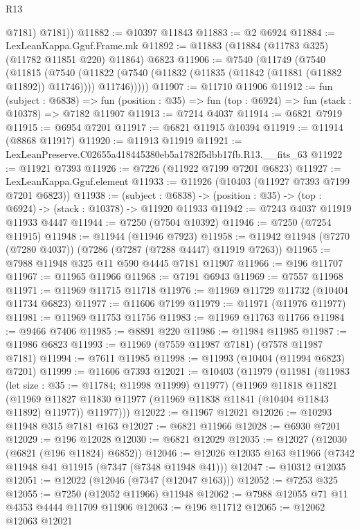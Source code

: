 \begin{lexlean}{R13}
\begin{coremodule}
          @7181)
        @7181))
@11882 := @10397 @11843
@11883 := @2 @6924
@11884 := LexLeanKappa.Gguf.Frame.mk
@11892 := @11883 (@11884 (@11783 @325) (@11782 @11851 @220) @11864) @6823
@11906 := @7540
    (@11749
      (@7540
        (@11815
          (@7540
            (@11822 (@7540 (@11832 (@11835 (@11842 (@11881 (@11882 @11892)) @11746)))) @11746)))))
@11907 := @11710 @11906
@11912 := fun (subject : @6838) =>
  fun (position : @35) => fun (top : @6924) => fun (stack : @10378) => @7182 @11907
@11913 := @7214 @4037
@11914 := @6821 @7919
@11915 := @6954 @7201
@11917 := @6821 @11915 @10394
@11919 := @11914 (@8868 @11917)
@11920 := @11913 @11919
@11921 := LexLeanPreserve.C02655a418445380eb5a1782f5dbb17fb.R13.__fits_63
@11922 := @11921 @7393
@11926 := @7226 (@11922 @7199 @7201 @6823)
@11927 := LexLeanKappa.Gguf.element
@11933 := @11926 (@10403 (@11927 @7393 @7199 @7201 @6823))
@11938 := (subject : @6838) ->
  (position : @35) -> (top : @6924) -> (stack : @10378) -> @11920 @11933
@11942 := @7243 @4037 @11919 @11933 @4447
@11944 := @7250 (@7504 @10392)
@11946 := @7250 (@7254 @11915)
@11948 := @11944 (@11946 @7923)
@11958 := @11942 @11948 (@7270 (@7280 @4037)) (@7286 (@7287 (@7288 @4447) @11919 @7263))
@11965 := @7988 @11948 @325 @11 @590 @4445 @7181 @11907
@11966 := @196 @11707
@11967 := @11965 @11966
@11968 := @7191 @6943
@11969 := @7557 @11968
@11971 := @11969 @11715 @11718
@11976 := @11969 @11729 @11732 (@10404 @11734 @6823)
@11977 := @11606 @7199
@11979 := @11971 (@11976 @11977)
@11981 := @11969 @11753 @11756
@11983 := @11969 @11763 @11766
@11984 := @9466 @7406
@11985 := @8891 @220
@11986 := @11984 @11985
@11987 := @11986 @6823
@11993 := @11969 (@7559 @11987 @7181) (@7578 @11987 @7181)
@11994 := @7611 @11985
@11998 := @11993 (@10404 (@11994 @6823) @7201)
@11999 := @11606 @7393
@12021 := @10403
    (@11979
      (@11981
        (@11983 (let size : @35 := @11784; @11998 @11999) @11977)
        (@11969
          @11818
          @11821
          (@11969 @11827 @11830 @11977 (@11969 @11838 @11841 (@10404 @11843 @11892) @11977))
          @11977)))
@12022 := @11967 @12021
@12026 := @10293 @11948 @315 @7181 @163
@12027 := @6821 @11966
@12028 := @6930 @7201
@12029 := @196 @12028
@12030 := @6821 @12029
@12035 := @12027 (@12030 (@6821 (@196 @11824) @6852))
@12046 := @12026 @12035 @163 @11966 (@7342 @11948 @41 @11915 (@7347 (@7348 @11948 @41)))
@12047 := @10312 @12035
@12051 := @12022 (@12046 (@7347 (@12047 @163)))
@12052 := @7253 @325
@12055 := @7250 (@12052 @11966) @11948
@12062 := @7988 @12055 @71 @11 @4353 @4444 @11709 @11906
@12063 := @196 @11712
@12065 := @12062 @12063 @12021

\end{coremodule}
\end{lexlean}
